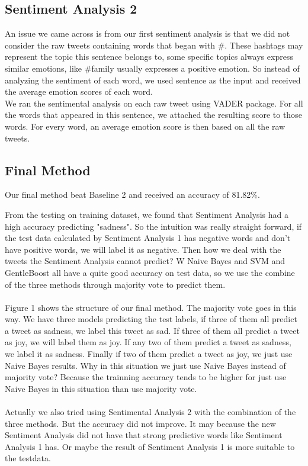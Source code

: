 \documentclass[]{article}
\begin{document}
\subsection{Sentiment Analysis 2}

An issue we came across is from our first sentiment analysis is that we did not consider the raw tweets containing words that began with \#. These hashtags may represent the topic this sentence belongs to, some specific topics always express similar emotions, like \#family usually expresses a positive emotion. So instead of analyzing the sentiment of each word, we used sentence as the input and received the average emotion scores of each word.\\

We ran the sentimental analysis on each raw tweet using VADER package. For all the words that appeared in this sentence, we attached the resulting score to those words. For every word, an average emotion score is then based on all the raw tweets. \\ 

\subsection{Final Method}

Our final method beat Baseline 2 and received an accuracy of 81.82\%. 

From the testing on training dataset, we found that Sentiment Analysis had a high accuracy predicting "sadness". So the intuition was really straight forward, if the test data calculated by Sentiment Analysis 1 has negative words and don't have positive words, we will label it as negative. Then how we deal with the tweets the Sentiment Analysis cannot predict? W Naive Bayes and SVM and GentleBoost all have a quite good accuracy on test data, so we use the combine of the three methods through majority vote to predict them.\\\\

Figure 1 shows the structure of our final method. The majority vote goes in this way. We have three models predicting the test labels, if three of them all predict a tweet as sadness, we label this tweet as sad. If three of them all predict a tweet as joy, we will label them as joy. If any two of them predict a tweet as sadness, we label it as sadness. Finally if two of them predict a tweet as joy, we just use Naive Bayes results. Why in this situation we just use Naive Bayes instead of majority vote? Because the trainning accuracy tends to be higher for just use Naive Bayes in this situation than use majority vote.\\\\
Actually we also tried using Sentimental Analysis 2 with the combination of the three methods. But the accuracy did not improve. It may because the new Sentiment Analysis did not have that strong predictive words like Sentiment Analysis 1 has. Or maybe the result of Sentiment Analysis 1 is more suitable to the testdata.
\end{document}

